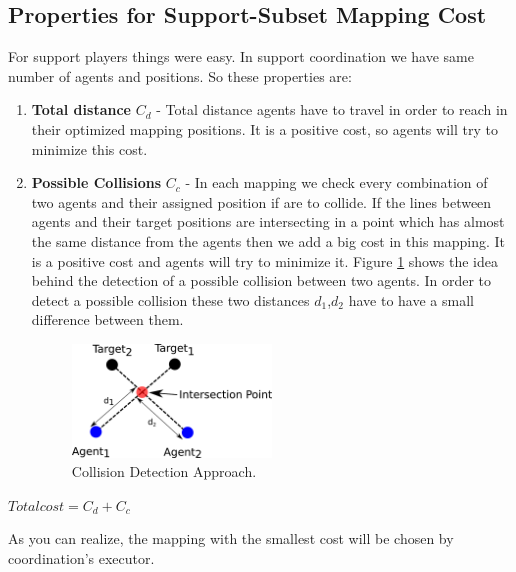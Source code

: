 \subsection{Properties for Support-Subset Mapping Cost}
For support players things were easy. In support coordination we have same number of agents and positions. So these properties are:  
\begin{enumerate}
\item \textbf{Total distance }$C_{d}$ - Total distance agents have to travel in order to reach in their optimized mapping positions. It is a positive cost, so agents will try to minimize this cost.
\item \textbf{Possible Collisions }$C_{c}$ - In each mapping we check every combination of two agents and their assigned position if are to collide. If the lines between agents and their target positions are intersecting in a point which has almost the same distance from the agents then we add a big cost in this mapping. It is a positive cost and agents will try to minimize it. Figure \ref{fig:AvoidCollision} shows the idea behind the detection of a possible collision between two agents. In order to detect a possible collision these two distances $d_{1}$,$d_{2}$ have to have a small difference between them.
\begin{figure}[htb!]
\centering
  \includegraphics[width=0.5\textwidth]{Chapter4/figures/AvoidCollision.pdf}
  \caption{Collision Detection Approach.} 
  \label{fig:AvoidCollision}
\end{figure}
\end{enumerate}
\begin{center}
$Total cost = C_{d}+C_{c}$
\end{center}
As you can realize, the mapping with the smallest cost will be chosen by coordination's executor.

